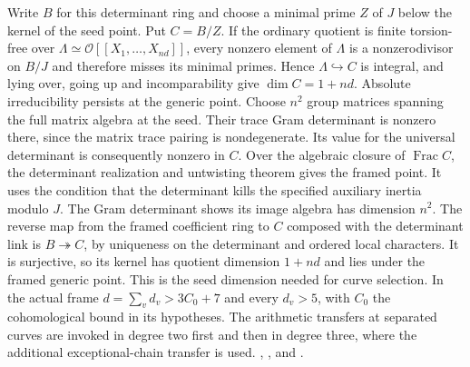 Write \(B\) for this determinant ring and choose a minimal prime \(Z\)
of \(J\) below the kernel of the seed point. Put \(C=B/Z\). If the
ordinary quotient is finite torsion-free over
\(\Lambda\simeq\mathcal O[[X_1,\ldots,X_{nd}]]\), every nonzero
element of \(\Lambda\) is a nonzerodivisor on \(B/J\) and therefore
misses its minimal primes. Hence \(\Lambda\hookrightarrow C\) is
integral, and lying over, going up and incomparability give
\(\dim C=1+nd\). Absolute irreducibility persists at the generic
point. Choose \(n^2\) group matrices spanning the full matrix algebra
at the seed. Their trace Gram determinant is nonzero there, since
the matrix trace pairing is nondegenerate. Its value for the
universal determinant is consequently nonzero in \(C\).
Over the algebraic closure of \(\operatorname{Frac} C\), the
determinant realization and untwisting theorem gives the framed
point. It uses the condition that the determinant kills the specified
auxiliary inertia modulo \(J\). The Gram determinant shows its
image algebra has dimension \(n^2\).
The reverse map from the framed coefficient ring to \(C\) composed
with the determinant link is \(B\twoheadrightarrow C\), by uniqueness
on the determinant and ordered local characters. It is surjective,
so its kernel has quotient dimension \(1+nd\) and lies under the
framed generic point. This is the seed dimension needed for curve
selection. In the actual frame \(d=\sum_v d_v>3C_0+7\) and every
\(d_v>5\), with \(C_0\) the cohomological bound in its hypotheses.
The arithmetic transfers at separated curves are invoked in degree
two first and then in degree three, where the additional exceptional-chain
transfer is used.
,
,
and .

